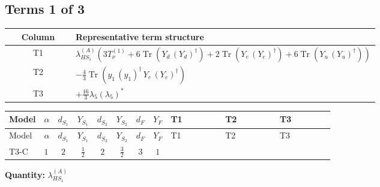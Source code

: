 \documentclass[8pt]{article}
\begin{document}
\begin{landscape}
\subsection*{Terms 1 of 3}
\begin{center}
\begin{tabular}{@{}c >{\raggedright\arraybackslash}p{0.82\linewidth}@{}}
\toprule
Column & Representative term structure \\
\midrule
T1 & \(\displaystyle {\lambda_{HS_1}^{(A)}} (3 T_{\nu}^{(1)}+6 \operatorname{Tr}\!\left({Y_d}\,\left({Y_d}\right)^{\dagger}\right)+2 \operatorname{Tr}\!\left({Y_e}\,\left({Y_e}\right)^{\dagger}\right)+6 \operatorname{Tr}\!\left({Y_u}\,\left({Y_u}\right)^{\dagger}\right))\) \\
\midrule
T2 & \(\displaystyle -\frac{4}{3} \operatorname{Tr}\!\left({y_1}\,\left({y_1}\right)^{\dagger}\,{Y_e}\,\left({Y_e}\right)^{\dagger}\right)\) \\
\midrule
T3 & \(\displaystyle +\frac{16}{3} {\lambda_5} \left({\lambda_5}\right)^{*}\) \\
\midrule
\bottomrule
\end{tabular}
\end{center}
\smallskip
\tiny
\begin{longtable}{@{}llcccccc >{\raggedright\arraybackslash}p{0.21\linewidth} >{\raggedright\arraybackslash}p{0.21\linewidth} >{\raggedright\arraybackslash}p{0.21\linewidth}@{}}
\toprule
Model & $\alpha$ & $d_{S_1}$ & $Y_{S_1}$ & $d_{S_2}$ & $Y_{S_2}$ & $d_F$ & $Y_F$ & T1 & T2 & T3 \\
\midrule
\endfirsthead
\toprule
Model & $\alpha$ & $d_{S_1}$ & $Y_{S_1}$ & $d_{S_2}$ & $Y_{S_2}$ & $d_F$ & $Y_F$ & T1 & T2 & T3 \\
\midrule
\endhead
T3-C & $1$ & $2$ & $\frac{1}{2}$ & $2$ & $\frac{3}{2}$ & $3$ & $1$ & \scriptsize\adjustbox{max width=\linewidth}{$\begin{gathered} {\lambda_{HS_1}^{(A)}} (3 T_{\nu}^{(1)}+6 \operatorname{Tr}\!\left({Y_d}\,\left({Y_d}\right)^{\dagger}\right)+2 \operatorname{Tr}\!\left({Y_e}\,\left({Y_e}\right)^{\dagger}\right)+6 \operatorname{Tr}\!\left({Y_u}\,\left({Y_u}\right)^{\dagger}\right))\end{gathered}$} & \scriptsize\adjustbox{max width=\linewidth}{$\begin{gathered} -\frac{4}{3} \operatorname{Tr}\!\left({y_1}\,\left({y_1}\right)^{\dagger}\,{Y_e}\,\left({Y_e}\right)^{\dagger}\right)\end{gathered}$} & \scriptsize\adjustbox{max width=\linewidth}{$\begin{gathered} +\frac{16}{3} {\lambda_5} \left({\lambda_5}\right)^{*}\end{gathered}$} \\
\midrule
\bottomrule
\end{longtable}
\clearpage
\noindent\textbf{Quantity: }$\lambda_{HS_1}^{(A)}$\par\smallskip

\end{landscape}
\end{document}
